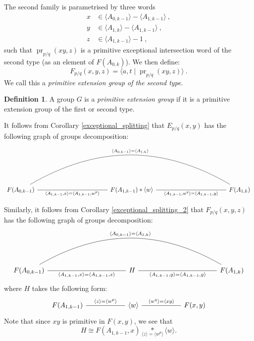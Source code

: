 \documentclass[11pt, a4paper]{amsart}
\theoremstyle{definition}
\newtheorem{definition}[theorem]{Definition}
\newcommand{\isom}{\cong}
\DeclareMathOperator{\pr}{pr}
\begin{document}
The second family is parametrised by three words 
\begin{align*}
x &\in \langle A_{0, k-1}\rangle - \langle A_{1, k-1}\rangle~,\\
y &\in \langle A_{1, k}\rangle - \langle A_{1, k-1}\rangle~,\\
z &\in \langle A_{1, k-1}\rangle-1~,
\end{align*}
such that $\pr_{p/q}(xy, z)$ is a primitive exceptional intersection word of the second type (as an element of $F(A_{0, k})$). We then define:
\begin{equation}
\label{pe_2}
F_{p/q}(x, y, z) = \langle a, t \mid \pr_{p/q}(xy, z)\rangle~.
\end{equation}
We call this a \emph{primitive extension group of the second type}.

\begin{definition}
A group $G$ is a \emph{primitive extension group} if it is a primitive extension group of the first or second type.
\end{definition}

It follows from Corollary \ref{exceptional_splitting} that $E_{p/q}(x, y)$ has the following graph of groups decomposition:
\[
\begin{tikzcd}[sep=2cm]
{F(A_{0, k-1})} \arrow[rr, "{\langle A_{1, k-1}, x\rangle = \langle A_{1, k-1}, w^p\rangle}"', no head] &  & {F(A_{1, k-1})*\langle w\rangle} \arrow[rr, "{\langle A_{1, k-1}, w^q\rangle = \langle A_{1, k-1}, y\rangle}"', no head] &  & {F(A_{1, k})} \arrow[llll, "{\langle A_{0,k-1}\rangle = \langle A_{1, k}\rangle}"', no head, bend right]
\end{tikzcd}
\]



Similarly, it follows from Corollary \ref{exceptional_splitting_2} that $F_{p/q}(x, y, z)$ has the following graph of groups decomposition:
\[
\begin{tikzcd}[sep=2cm]
{F(A_{0, k-1})} \arrow[rr, "{\langle A_{1, k-1}, x\rangle = \langle A_{1, k-1}, x\rangle}"', no head] &  & H \arrow[rr, "{\langle A_{1, k-1}, y\rangle = \langle A_{1, k-1}, y\rangle}"', no head] &  & {F(A_{1, k})} \arrow[llll, "{\langle A_{0,k-1}\rangle = \langle A_{1, k}\rangle}"', no head, bend right]
\end{tikzcd}
\]
where $H$ takes the following form:
\[
\begin{tikzcd}[sep=2cm]
{F(A_{1, k-1})} \arrow[r, "\langle z\rangle = \langle w^p\rangle", no head] & \langle w\rangle \arrow[r, "\langle w^q\rangle = \langle xy\rangle", no head] & {F(x, y)}
\end{tikzcd}
\]
Note that since $xy$ is primitive in $F(x, y)$, we see that 
\[
H \isom F(A_{1, k-1}, x)\underset{\langle z\rangle = \langle w^p\rangle}{\ast}\langle w\rangle.
\]
\end{document}

